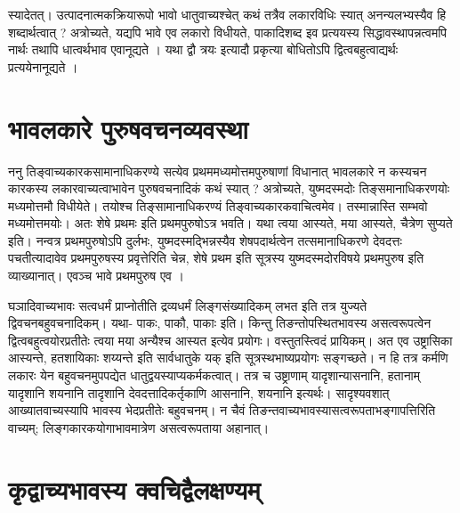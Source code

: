 {स्यादेतत्। उत्पादनात्मकक्रियारूपो भावो धातुवाच्यश्चेत् कथं तत्रैव लकारविधिः स्यात् अनन्यलभ्यस्यैव हि शब्दार्थत्वात् ? अत्रोच्यते, यद्यपि भावे एव लकारो विधीयते, पाकादिशब्द इव प्रत्ययस्य सिद्धावस्थापन्नत्वमपि नार्थः तथापि धात्वर्थभाव एवानूद्यते । यथा द्वौ त्रयः इत्यादौ प्रकृत्या बोधितोऽपि द्वित्वबहुत्वाद्यर्थः प्रत्ययेनानूद्यते ।

\section*{भावलकारे पुरुषवचनव्यवस्था} 

ननु तिङ्वाच्यकारकसामानाधिकरण्ये सत्येव प्रथममध्यमोत्तमपुरुषाणां विधानात् भावलकारे न कस्यचन कारकस्य लकारवाच्यत्वाभावेन पुरुषवचनादिकं कथं स्यात् ? अत्रोच्यते, युष्मदस्मदोः तिङ्समानाधिकरणयोः मध्यमोत्तमौ विधीयेते। तयोश्च तिङ्सामानाधिकरण्यं तिङ्वाच्यकारकवाचित्वमेव। तस्मान्नास्ति सम्भवो मध्यमोत्तमयोः। अतः शेषे प्रथमः इति प्रथमपुरुषोऽत्र भवति। यथा त्वया आस्यते, मया आस्यते, चैत्रेण सुप्यते इति। नन्वत्र प्रथमपुरुषोऽपि दुर्लभः, युष्मदस्मद्भिन्नस्यैव शेषपदार्थत्वेन तत्समानाधिकरणे देवदत्तः पचतीत्यादावेव प्रथमपुरुषस्य प्रवृत्तेरिति चेन्न, शेषे प्रथम इति सूत्रस्य युष्मदस्मदोरविषये प्रथमपुरुष इति व्याख्यानात्। एवञ्च भावे प्रथमपुरुष एव ।

घञादिवाच्यभावः सत्वधर्मं प्राप्नोतीति द्रव्यधर्मं लिङ्गसंख्यादिकम् लभत इति तत्र युज्यते द्विवचनबहुवचनादिकम्। यथा- पाकः, पाकौ, पाकाः इति। किन्तु तिङन्तोपस्थितभावस्य असत्वरूपत्वेन द्वित्वबहुत्वयोरप्रतीतेः त्वया मया अन्यैश्च आस्यत इत्येव प्रयोगः। वस्तुतस्त्विदं प्रायिकम्। अत एव उष्ट्रासिका आस्यन्ते, हतशायिकाः शय्यन्ते इति सार्वधातुके यक् इति सूत्रस्थभाष्यप्रयोगः सङ्गच्छते। न हि तत्र कर्मणि लकारः येन बहुवचनमुपपद्येत धातुद्वयस्याप्यकर्मकत्वात्। तत्र च उष्ट्राणाम् यादृशान्यासनानि, हतानाम् यादृशानि शयनानि तादृशानि देवदत्तादिकर्तृकाणि आसनानि, शयनानि इत्यर्थः। सादृश्यवशात् आख्यातवाच्यस्यापि भावस्य भेदप्रतीतेः बहुवचनम्। न चैवं तिङन्तवाच्यभावस्यासत्वरूपताभङ्गापत्तिरिति वाच्यम्; लिङ्गकारकयोगाभावमात्रेण असत्वरूपताया अहानात्।

\section*{कृद्वाच्यभावस्य क्वचिद्वैलक्षण्यम्} 

}
